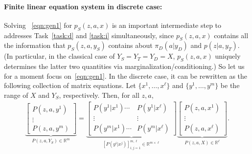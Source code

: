 \documentclass[letterpaper]{article} %
\theoremstyle{definition}%
\theoremstyle{definition}
\newcommand{\Obs}{Y}
\newcommand{\obs}{y}
\newcommand{\out}{z}
\newcommand{\todo}[1]{\textcolor{red}{#1}}
\begin{document}
\newcommand{\w}{P(\out, a, X)}
\newcommand{\F}{[P( y^i | x^j)]_{i,j=1}^{m, \ell}}
\newcommand{\vv}{P(\out, a, Y_S)}


\paragraph{Finite linear equation system in discrete case:}
Solving %
~\eqref{eqn:gen1} for $p_S(z, a, x)$ is an important intermediate step to addresses Task~\ref{task:d} and \ref{task:i} simultaneously, since $p_S(z, a, x)$ contains all the information that $p_S(z, a, \obs_S)$ contains about $\pi_D(a|y_D)$ and $p(\out | a, y_T)$.
(In particular, in the classical case of $Y_S=Y_T=Y_D=X$, $p_S(z, a, x)$ uniquely determines the latter two quantities via marginalization/conditioning.)
So let us for a moment focus on~\eqref{eqn:gen1}.
In the discrete case, it can be rewritten as the following collection of matrix equations.
Let  $\{ x^1, \ldots, x^\ell \}$ and $\{ y^1, \ldots, y^m \}$ be the range of $X$ and $\Obs_S$, respectively. 
Then, for all $ \out, a$,
	\begin{align}
	\underbrace{\left[ \!\!\!\begin{array}{c} P(\out, a, \obs^1) \\ \vdots \\ P(\out, a, \obs^m) \end{array} \!\!\right]}_{\vv \in \mathbb{R}^{m}} \!\!\!=\!\!\!
	\underbrace{\left[ \!\!\!\begin{array}{cc} P( y^1 | x^1) \cdots\!\!\!\!\!\! \!\!  & P( y^1 | x^\ell) \\ \vdots & \vdots \\   P( y^m | x^1)  \cdots\!\!\!\!\!\! \!\!  & P( y^m | x^\ell) \end{array}\!\!\! \right]}_{\F \in \mathbb{R}^{  m \times \ell} } \!
	\underbrace{\left[ \!\!\!\begin{array}{c} P(\out, a, x^1) \\ \vdots \\ P(\out, a, x^\ell) \end{array} \!\!\!\right]}_{P(\out, a, X)  \in \mathbb{R}^{\ell}} \!\!. \label{eqn:possible}
	\end{align}
%
%
\end{document}
